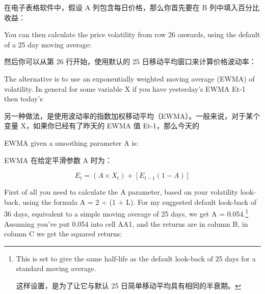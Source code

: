\begin{chineseblock}在电子表格软件中，假设 A 列包含每日价格，那么你首先要在 B 列中填入百分比收益：\end{chineseblock}

\begin{quote}
\begingroup\color{\englishbodycolorname} \ttfamily{} \endgroup
\end{quote}

\begin{englishblock} You can then calculate the price volatility from row 26 onwards, using the default of a 25 day moving average: \end{englishblock}

\begin{chineseblock}然后你可以从第 26 行开始，使用默认的 25 日移动平均窗口来计算价格波动率：\end{chineseblock}

\begin{quote}
\begingroup\color{\englishbodycolorname} \ttfamily{} \endgroup
\end{quote}

\begin{englishblock} The alternative is to use an exponentially weighted moving average (EWMA) of volatility. In general for some variable X if you have yesterday's EWMA Et-1 then today's \end{englishblock}

\begin{chineseblock}另一种做法，是使用波动率的指数加权移动平均（EWMA）。一般来说，对于某个变量 X，如果你已经有了昨天的 EWMA 值 Et-1，那么今天的\end{chineseblock}

\bipairgap

\begin{englishblock} EWMA given a smoothing parameter A is: \end{englishblock}

\begin{chineseblock} EWMA 在给定平滑参数 A 时为：\end{chineseblock}

\[E_t = (A \times X_t) + \left[E_{t-1}(1-A)\right] \]

\begin{englishblock} First of all you need to calculate the A parameter, based on your volatility look-back, using the formula A = 2 ÷ (1 + L). For my suggested default look-back of 36 days, equivalent to a simple moving average of 25 days, we get A = 0.054.\footnote{This is set to give the same half-life as the default look-back of 25 days for a standard moving average. \par 这样设置，是为了让它与默认 25 日简单移动平均具有相同的半衰期。} Assuming you've put 0.054 into cell AA1, and the returns are in column B, in column C we get the squared returns: \end{englishblock}

